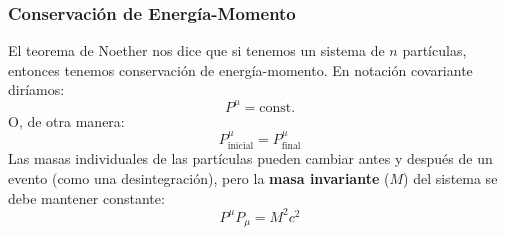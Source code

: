 \documentclass[]{article}
\numberwithin{equation}{section}
\begin{document}
\subsubsection{Conservación de Energía-Momento}
El teorema de Noether nos dice que si tenemos un sistema de \(n\) partículas, entonces tenemos conservación de energía-momento. En notación covariante diríamos:
\begin{equation}
	P^\mu = \text{const.}
\end{equation}
O, de otra manera:
\begin{equation}
	P^\mu_{\text{inicial}} = P^\mu_{\text{final}} \label{eqn:cons_energia_momento}
\end{equation}
Las masas individuales de las partículas pueden cambiar antes y después de un evento (como una desintegración), pero la \textbf{masa invariante} (\(M\)) del sistema se debe mantener constante:
\begin{equation}
	P^\mu P_\mu = M^2c^2
\end{equation}
\end{document}

